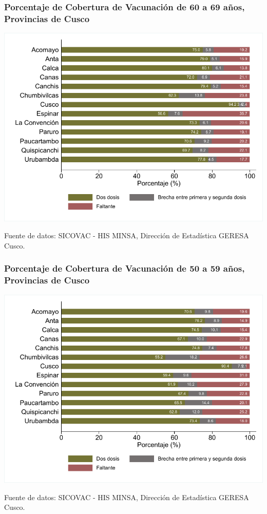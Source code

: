 \documentclass[xcolor=table]{beamer}
\begin{document}
\begin{frame}[label=vacunas_60]
	\frametitle{Porcentaje de Cobertura de Vacunación de 60 a 69 años, Provincias de Cusco}
	\vspace{-.5cm}
	\begin{center}
		\includegraphics[width=0.8\linewidth, trim={.2cm .5cm .2cm .2cm},clip]{../figuras/vacunacion_provincial_edad_6.pdf}
	\end{center}
	{\tiny Fuente de datos: SICOVAC - HIS MINSA, Dirección de Estadística GERESA Cusco. \\}
	\hyperlink{cobertura_vacuna_provincias}{}
\end{frame}

\begin{frame}[label=vacunas_50]
	\frametitle{Porcentaje de Cobertura de Vacunación de 50 a 59 años, Provincias de Cusco}
	\vspace{-.5cm}
	\begin{center}
		\includegraphics[width=0.8\linewidth, trim={.2cm .5cm .2cm .2cm},clip]{../figuras/vacunacion_provincial_edad_5.pdf}
	\end{center}
	{\tiny Fuente de datos: SICOVAC - HIS MINSA, Dirección de Estadística GERESA Cusco. \\}
\hyperlink{cobertura_vacuna_provincias}{}
\end{frame}
\end{document}
